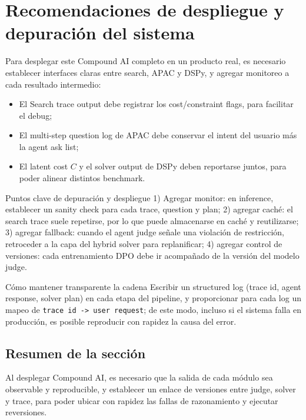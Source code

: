 \section{Recomendaciones de despliegue y depuración del sistema}

Para desplegar este Compound AI completo en un producto real, es necesario establecer interfaces claras entre search, APAC y DSPy, y agregar monitoreo a cada resultado intermedio:
\begin{itemize}
    \item El Search trace output debe registrar los cost/constraint flags, para facilitar el debug;
    \item El multi-step question log de APAC debe conservar el intent del usuario más la agent ask list;
    \item El latent cost \(C\) y el solver output de DSPy deben reportarse juntos, para poder alinear distintos benchmark.
\end{itemize}

\begin{importantbox}{Puntos clave de depuración y despliegue}
1) Agregar monitor: en inference, establecer un sanity check para cada trace, question y plan; 2) agregar caché: el search trace suele repetirse, por lo que puede almacenarse en caché y reutilizarse; 3) agregar fallback: cuando el agent judge señale una violación de restricción, retroceder a la capa del hybrid solver para replanificar; 4) agregar control de versiones: cada entrenamiento DPO debe ir acompañado de la versión del modelo judge.
\end{importantbox}

\begin{knowledgebox}{Cómo mantener transparente la cadena}
Escribir un structured log (trace id, agent response, solver plan) en cada etapa del pipeline, y proporcionar para cada log un mapeo de \texttt{trace id -> user request}; de este modo, incluso si el sistema falla en producción, es posible reproducir con rapidez la causa del error.
\end{knowledgebox}

\subsection{Resumen de la sección}

Al desplegar Compound AI, es necesario que la salida de cada módulo sea observable y reproducible, y establecer un enlace de versiones entre judge, solver y trace, para poder ubicar con rapidez las fallas de razonamiento y ejecutar reversiones.

